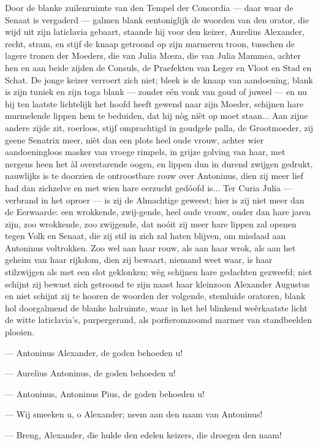 \documentclass[a4paper, 12pt, oneside, dutch]{article}
\begin{document}
Door de blanke zuilenruimte van den Tempel der Concordia --- daar waar de Senaat is vergaderd --- galmen blank eentoniglijk de woorden van den orator, die wijd uit zijn laticlavia gebaart, staande hij voor den keizer, Aurelius Alexander, recht, stram, en stijf de knaap getroond op zijn marmeren troon, tusschen de lagere tronen der Moeders, die van Julia Mœza, die van Julia Mammea, achter hen en aan beide zijden de Consuls, de Praefekten van Leger en Vloot en Stad en Schat. De jonge keizer verroert zich niet; bleek is de knaap van aandoening, blank is zijn tuniek en zijn toga blank --- zonder eén vonk van goud of juweel --- en nu hij ten laatste lichtelijk het hoofd heeft gewend naar zijn Moeder, schijnen hare murmelende lippen hem te beduiden, dat hij nòg nièt op moet staan... Aan zijne andere zijde zit, roerloos, stijf omprachtigd in goudgele palla, de Grootmoeder, zij geene Senatrix meer, nièt dan een plots heel oude vrouw, achter wier aandoeningloos masker van vroege rimpels, in grijze golving van haar, met nergens heen het àl overstarende oogen, en lippen dun in durend zwijgen gedrukt, nauwlijks is te doorzien de ontroostbare rouw over Antoninus, dien zij meer lief had dan zichzelve en met wien hare eerzucht gedóofd is... Ter Curia Julia --- verbrand in het oproer --- is zij de Almachtige geweest; hier is zij niet meer dan de Eerwaarde: een wrokkende, zwij-gende, heel oude vrouw, ouder dan hare jaren zijn, zoo wrokkende, zoo zwijgende, dat noóit zij meer hare lippen zal openen tegen Volk en Senaat, die zij stil in zich zal haten blijven, om misdaad aan Antoninus voltrokken. Zoo wel aan haar rouw, als aan haar wrok, als aan het geheim van haar rijkdom, dien zij bewaart, niemand weet waar, is haar stilzwijgen als met een slot geklonken; wèg schijnen hare gedachten gezweefd; niet schijnt zij bewust zich getroond te zijn naast haar kleinzoon Alexander Augustus en niet schijnt zij te hooren de woorden der volgende, stemluide oratoren, blank hol doorgalmend de blanke halruimte, waar in het hel blinkend weêrkaatste licht de witte laticlavia's, purpergerand, als porfieromzoomd marmer van standbeelden plooien.

--- Antoninus Alexander, de goden behoeden u!

--- Aurelius Antoninus, de goden behoeden u!

--- Antoninus, Antoninus Pius, de goden behoeden u!

--- Wij smeeken u, o Alexander; neem aan den naam van Antoninus!

--- Breng, Alexander, die hulde den edelen keizers, die droegen den naam!
\end{document}
